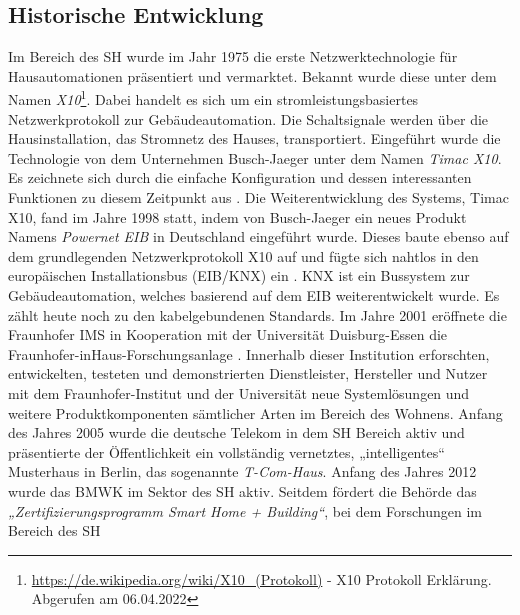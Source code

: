     \subsection{Historische Entwicklung}
    \label{subsec:entwicklung_sh}
        Im Bereich des \acl{SH} wurde im Jahr 1975 die erste Netzwerktechnologie für Hausautomationen 
        präsentiert und vermarktet. Bekannt wurde diese unter dem Namen \textit{X10}\footnote{\url{https://de.wikipedia.org/wiki/X10_(Protokoll)} - X10 Protokoll Erklärung. Abgerufen am 06.04.2022}. 
        Dabei handelt es sich um ein stromleistungsbasiertes Netzwerkprotokoll zur Gebäudeautomation. Die 
        Schaltsignale werden über die Hausinstallation, das Stromnetz des Hauses, transportiert. Eingeführt wurde die 
        Technologie von dem Unternehmen Busch-Jaeger unter dem Namen \textit{Timac X10}. Es zeichnete sich durch die 
        einfache Konfiguration und dessen interessanten Funktionen zu diesem Zeitpunkt aus \cite{aschendorf2014energiemanagement}. %
        Die Weiterentwicklung des Systems, Timac X10, fand im Jahre 1998 statt, indem von Busch-Jaeger ein neues 
        Produkt Namens \textit{Powernet EIB} in Deutschland eingeführt wurde. Dieses baute ebenso auf dem grundlegenden 
        Netzwerkprotokoll X10 auf und fügte sich nahtlos in den europäischen Installationsbus (EIB/KNX) ein \cite{busch-jaeger}. 
        KNX ist ein Bussystem zur Gebäudeautomation, welches basierend auf dem EIB weiterentwickelt wurde. Es 
        zählt heute noch zu den kabelgebundenen Standards. Im Jahre 2001 eröffnete die Fraunhofer IMS in Kooperation 
        mit der Universität Duisburg-Essen die Fraunhofer-inHaus-Forschungsanlage \cite{fraunhofer-forschungsanlage}. 
        Innerhalb dieser Institution erforschten, entwickelten, testeten und demonstrierten Dienstleister, Hersteller und Nutzer 
        mit dem Fraunhofer-Institut und der Universität neue Systemlösungen und weitere Produktkomponenten sämtlicher Arten 
        im Bereich des Wohnens. Anfang des Jahres 2005 wurde die deutsche Telekom in dem \acl{SH} Bereich aktiv und 
        präsentierte der Öffentlichkeit ein vollständig vernetztes, „intelligentes“ Musterhaus in Berlin, das sogenannte 
        \textit{T-Com-Haus}. Anfang des Jahres 2012 wurde das \ac{BMWK} im Sektor des \acl{SH} aktiv. Seitdem fördert die 
        Behörde das \textit{„Zertifizierungsprogramm Smart Home + Building“}, bei dem Forschungen im Bereich des \acl{SH} 
